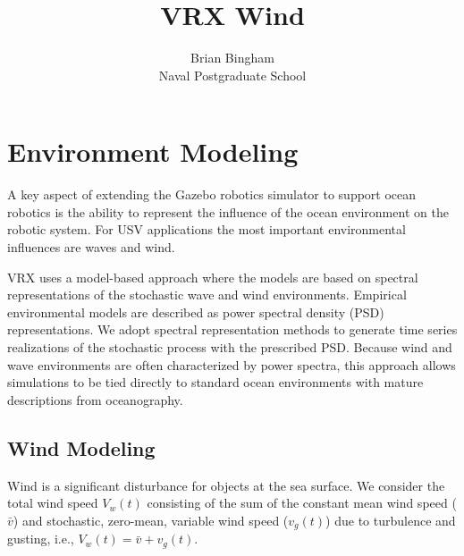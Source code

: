 \documentclass[11pt]{article}
\author{\IEEEauthorblockN{Brian Bingham}
\IEEEauthorblockA{\textit{Naval Postgraduate School}\\
bbingham@nps.edu}}
\begin{document}


\newcommand{\SF}{0.7}
\newcommand{\SFb}{0.45}
\newcommand{\SFPic}{0.45}
\newcommand{\SFPlot}{0.45}
\newcommand{\SFc}{0.45}
\newcommand{\FigWidth}{\SFb}

\newcommand{\figref}[1] {Fig.~\ref{#1}}

\newcommand{\wamv}{WAM\=/V}

\newcommand{\scaleOneTwo}[2] {\scalebox{#1}}

\graphicspath{{./images/}{./src/}}

\title{VRX Wind}
\author{Brian Bingham \\ Naval Postgraduate School}


\maketitle


\section{Environment Modeling}
A key aspect of extending the Gazebo robotics simulator to support ocean robotics is the ability to represent the influence of the ocean environment on the robotic system.  For USV applications the most important environmental influences are waves and wind.

VRX uses a model-based approach where the models are based on spectral representations of the stochastic wave and wind environments.  Empirical environmental models are described as power spectral density (PSD) representations.  We adopt spectral representation methods \citep{shinozuka91simulation} to generate time series realizations of the stochastic process with the prescribed PSD.  Because wind and wave environments are often characterized by power spectra, this approach allows simulations to be tied directly to standard ocean environments with mature descriptions from oceanography.


\subsection{Wind Modeling}\label{s:wind_model}
Wind is a significant disturbance for objects at the sea surface. We consider the total wind speed $V_w(t)$ consisting of the sum of the constant mean wind speed ($\bar{v}$) and stochastic, zero-mean, variable wind speed ($v_g(t)$) due to turbulence and gusting, i.e., $V_w(t)=\bar{v}+v_g(t)$.
\end{document}
